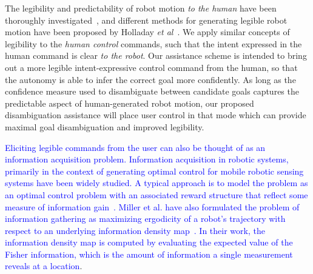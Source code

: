 \documentclass[conference]{IEEEtran}
\begin{document}
The legibility and predictability of robot motion \textit{to the human} have been thoroughly investigated~\cite{dragan2013legibility}, and different methods for generating legible robot motion have been proposed by Holladay \textit{et al}~\cite{holladay2014legible}. We apply similar concepts of legibility to the \textit{human control} commands, such that the intent expressed in the human command is clear \textit{to the robot}. Our assistance scheme is intended to bring out a more legible intent-expressive control command from the human, so that the autonomy is able to infer the correct goal more confidently. As long as the confidence measure used to disambiguate between candidate goals captures the predictable aspect of human-generated robot motion, our proposed disambiguation assistance will place user control in that mode which can provide maximal goal disambiguation and improved legibility.

\textcolor{blue}{Eliciting legible commands from the user can also be thought of as an information acquisition problem. Information acquisition in robotic systems, primarily in the context of generating optimal control for mobile robotic sensing systems have been widely studied. A typical approach is to model the problem as an optimal control problem with an associated reward structure that reflect some measure of information gain~\cite{atanasov2014information}. Miller et al. have also formulated the problem of information gathering as maximizing ergodicity of a robot's trajectory with respect to an underlying information density map~\cite{miller2013trajectory,miller2016ergodic}. In their work, the information density map is computed by evaluating the expected value of the Fisher information, which is the amount of information a single measurement reveals at a location}. 
\end{document}
